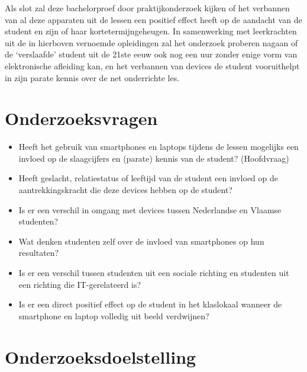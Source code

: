 Als slot zal deze bachelorproef door praktijkonderzoek kijken of het verbannen van al deze apparaten uit de lessen een positief effect heeft op de aandacht van de student en zijn of haar kortetermijngeheugen. In samenwerking met leerkrachten uit de in hierboven vernoemde opleidingen zal het onderzoek proberen nagaan of de ‘verslaafde’ student uit de 21ste eeuw ook nog een uur zonder enige vorm van elektronische afleiding kan, en het verbannen van devices de student vooruithelpt in zijn parate kennis over de net onderrichte les.

\section{Onderzoeksvragen}
\label{sec:onderzoeksvragen}

\begin{itemize}
	\item Heeft het gebruik van smartphones en laptops tijdens de lessen mogelijks een invloed op de slaagcijfers en (parate) kennis van de student? (Hoofdvraag)
	\item Heeft geslacht, relatiestatus of leeftijd van de student een invloed op de aantrekkingskracht die deze devices hebben op de student?
	\item Is er een verschil in omgang met devices tussen Nederlandse en Vlaamse studenten?
	\item Wat denken studenten zelf over de invloed van smartphones op hun resultaten?
	\item Is er een verschil tussen studenten uit een sociale richting en studenten uit een richting die IT-gerelateerd is?
	\item Is er een direct positief effect op de student in het klaslokaal wanneer de smartphone en laptop volledig uit beeld verdwijnen?
\end{itemize}

\section{Onderzoeksdoelstelling}
\label{sec:onderzoeksdoelstelling}


